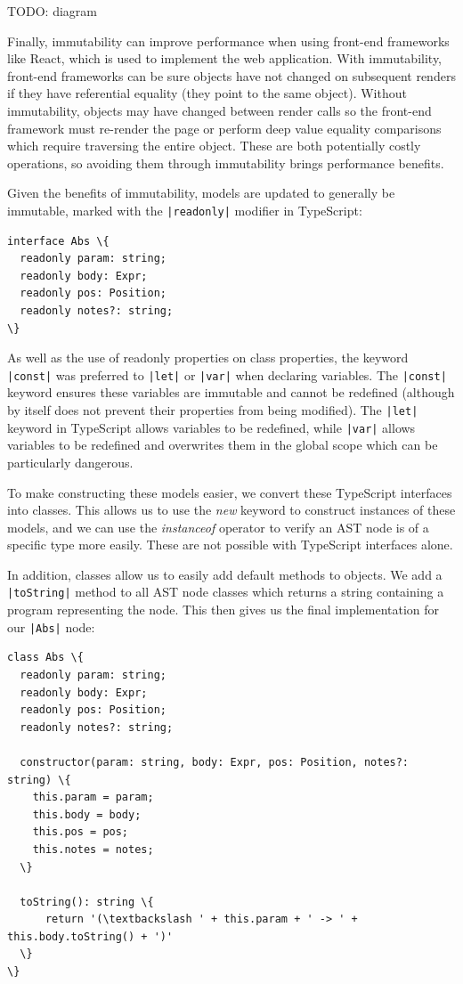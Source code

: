 \documentclass[a4paper,fleqn,oneside,12pt]{report}
\begin{document}
TODO: diagram

Finally, immutability can improve performance when using front-end frameworks like React, which is used to implement the web application. With immutability, front-end frameworks can be sure objects have not changed on subsequent renders if they have referential equality (they point to the same object). Without immutability, objects may have changed between render calls so the front-end framework must re-render the page or perform deep value equality comparisons which require traversing the entire object. These are both potentially costly operations, so avoiding them through immutability brings performance benefits.

Given the benefits of immutability, models are updated to generally be immutable, marked with the \texttt{|readonly|} modifier in TypeScript:

\begin{verbatim}
interface Abs \{
  readonly param: string;
  readonly body: Expr;
  readonly pos: Position;
  readonly notes?: string;
\}
\end{verbatim}

As well as the use of readonly properties on class properties, the keyword \texttt{|const|} was preferred to \texttt{|let|} or \texttt{|var|} when declaring variables. The \texttt{|const|} keyword ensures these variables are immutable and cannot be redefined (although by itself does not prevent their properties from being modified). The \texttt{|let|} keyword in TypeScript allows variables to be redefined, while \texttt{|var|} allows variables to be redefined and overwrites them in the global scope which can be particularly dangerous.

To make constructing these models easier, we convert these TypeScript interfaces into classes. This allows us to use the \textit{new} keyword to construct instances of these models, and we can use the \textit{instanceof} operator to verify an AST node is of a specific type more easily. These are not possible with TypeScript interfaces alone.

In addition, classes allow us to easily add default methods to objects. We add a \texttt{|toString|} method to all AST node classes which returns a string containing a program representing the node. This then gives us the final implementation for our \texttt{|Abs|} node:

\begin{verbatim}
class Abs \{
  readonly param: string;
  readonly body: Expr;
  readonly pos: Position;
  readonly notes?: string;

  constructor(param: string, body: Expr, pos: Position, notes?: string) \{
    this.param = param;
    this.body = body;
    this.pos = pos;
    this.notes = notes;
  \}

  toString(): string \{
      return '(\textbackslash ' + this.param + ' -> ' + this.body.toString() + ')'
  \}
\}
\end{verbatim}
\end{document}

